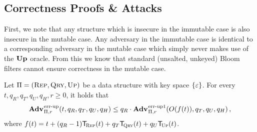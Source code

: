 \subsection{Correctness Proofs \& Attacks}

First, we note that any structure which is insecure in the immutable case is also insecure in the mutable case. Any adversary in the immutable case is identical to a corresponding adversary in the mutable case which simply never makes use of the $\mathbf{Up}\hspace{0.5pt}$ oracle. From this we know that standard (unsalted, unkeyed) Bloom filters cannot ensure correctness in the mutable case.

\begin{lemma}\label{lemma:errep}
  Let $\mathrm{\Pi} = (\textsc{Rep}, \textsc{Qry}, \textsc{Up})$ be a data structure with key
  space $\{\varepsilon\}$. For every $t, q_R, q_T, q_U, q_H, r\geq 0$, it holds that
  \[
    \Adv{\errep}_{\struct,r}(t, q_R, q_T, q_U, q_H) \leq
    q_R\cdot\Adv{\errep1}_{\struct,r}(O(f(t)), q_T, q_U, q_H) \,,
  \]
  where $f(t) = t + (q_R-1)\ticks(\Rep,t) + q_T\ticks(\Qry,t) + q_U\ticks(\Up,t)$.
\end{lemma}

